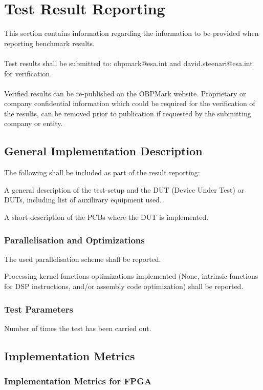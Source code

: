 \chapter{Test Result Reporting}
This section contains information regarding the information to be provided when reporting benchmark results.
\\
\\
Test results shall be submitted to: obpmark@esa.int and david.steenari@esa.int for verification.
\\
\\
Verified results can be re-published on the OBPMark website. Proprietary or company confidential information which could be required for the verification of the results, can be removed prior to publication if requested by the submitting company or entity.

\section{General Implementation Description}
The following shall be included as part of the result reporting: 

A general description of the test-setup and the DUT (Device Under Test) or DUTs, including list of auxilirary equipment used.

A short description of the PCBs where the DUT is implemented. 

\subsection{Parallelisation and Optimizations}
The used parallelisation scheme shall be reported.

Processing kernel functions optimizations implemented (None, intrinsic functions for DSP instructions, and/or assembly code optimization) shall be reported.

\subsection{Test Parameters}

Number of times the test has been carried out. 

\section{Implementation Metrics}

\subsection{Implementation Metrics for FPGA}

